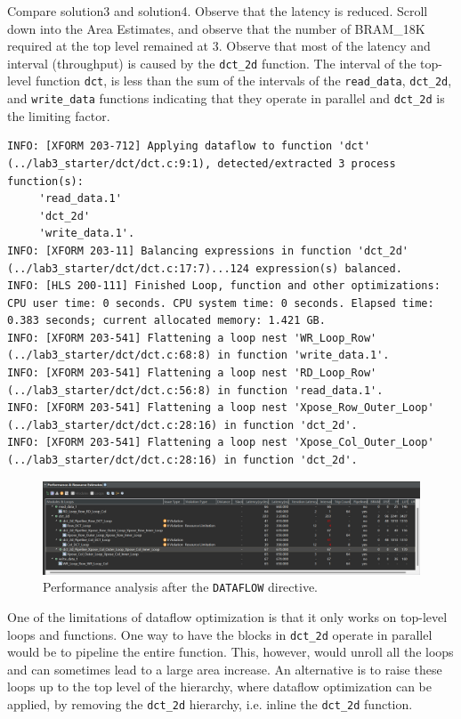 \documentclass[a4paper,12pt,twoside]{article}
\begin{document}
Compare solution3 and solution4. Observe that the latency is reduced. Scroll down into the Area Estimates, and observe that the number of BRAM\_18K required at the top level remained at 3. Observe that most of the latency and interval (throughput) is caused by the \texttt{dct\_2d} function. The interval of the top-level function \texttt{dct}, is less than the sum of the intervals of the \texttt{read\_data}, \texttt{dct\_2d}, and \texttt{write\_data} functions indicating that they operate in parallel and \texttt{dct\_2d} is the limiting factor.%
\begin{verbatim}
INFO: [XFORM 203-712] Applying dataflow to function 'dct' (../lab3_starter/dct/dct.c:9:1), detected/extracted 3 process function(s): 
	 'read_data.1'
	 'dct_2d'
	 'write_data.1'.
INFO: [XFORM 203-11] Balancing expressions in function 'dct_2d' (../lab3_starter/dct/dct.c:17:7)...124 expression(s) balanced.
INFO: [HLS 200-111] Finished Loop, function and other optimizations: CPU user time: 0 seconds. CPU system time: 0 seconds. Elapsed time: 0.383 seconds; current allocated memory: 1.421 GB.
INFO: [XFORM 203-541] Flattening a loop nest 'WR_Loop_Row' (../lab3_starter/dct/dct.c:68:8) in function 'write_data.1'.
INFO: [XFORM 203-541] Flattening a loop nest 'RD_Loop_Row' (../lab3_starter/dct/dct.c:56:8) in function 'read_data.1'.
INFO: [XFORM 203-541] Flattening a loop nest 'Xpose_Row_Outer_Loop' (../lab3_starter/dct/dct.c:28:16) in function 'dct_2d'.
INFO: [XFORM 203-541] Flattening a loop nest 'Xpose_Col_Outer_Loop' (../lab3_starter/dct/dct.c:28:16) in function 'dct_2d'.
\end{verbatim}
\begin{figure}[H]
    \centering
    \includegraphics[width=\textwidth]{images/20.png}
    \caption{Performance analysis after the \texttt{DATAFLOW} directive.}
\end{figure}
One of the limitations of dataflow optimization is that it only works on top-level loops and functions. One way to have the blocks in \texttt{dct\_2d} operate in parallel would be to pipeline the entire function. This, however, would unroll all the loops and can sometimes lead to a large area increase. An alternative is to raise these loops up to the top level of the hierarchy, where dataflow optimization can be applied, by removing the \texttt{dct\_2d} hierarchy, i.e. inline the \texttt{dct\_2d} function.
\end{document}
